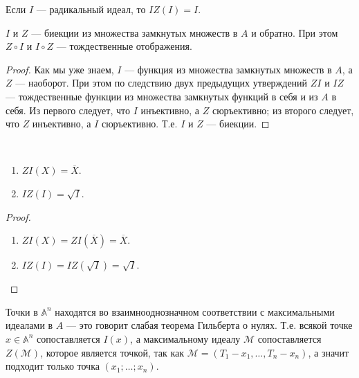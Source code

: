 \documentclass[12pt,a4paper]{article}
\renewcommand{\AA}{\ensuremath{\mathbb{A}}\xspace}
\begin{document}
    \begin{theorem}
        Если $I$ --- радикальный идеал, то $IZ(I) = I$.
    \end{theorem}

    \begin{corollary}
        $I$ и $Z$ --- биекции из множества замкнутых множеств в $A$ и обратно. При этом $Z \circ I$ и $I \circ Z$ --- тождественные отображения.
    \end{corollary}

    \begin{proof}
        Как мы уже знаем, $I$ --- функция из множества замкнутых множеств в $A$, а $Z$ --- наоборот. При этом по следствию двух предыдущих утверждений $ZI$ и $IZ$ --- тождественные функции из множества замкнутых функций в себя и из $A$ в себя. Из первого следует, что $I$ инъективно, а $Z$ сюръективно; из второго следует, что $Z$ инъективно, а $I$ сюръективно. Т.е. $I$ и $Z$ --- биекции.
    \end{proof}

    \begin{corollary}\ 
        \begin{enumerate}
            \item $ZI(X) = \overline{X}$.
            \item $IZ(I) = \sqrt{I}$.
        \end{enumerate}
    \end{corollary}

    \begin{proof}
        \begin{enumerate}
            \item $ZI(X) = ZI(\overline{X}) = \overline{X}$.
            \item $IZ(I) = IZ(\sqrt{I}) = \sqrt{I}$.
        \end{enumerate}
    \end{proof}

    \begin{remark}
        Точки в $\AA^n$ находятся во взаимнооднозначном соответствии с максимальными идеалами в $A$ --- это говорит слабая теорема Гильберта о нулях. Т.е. всякой точке $x \in \AA^n$ сопоставляется $I(x)$, а максимальному идеалу $\mathcal{M}$ сопоставляется $Z(\mathcal{M})$, которое является точкой, так как $\mathcal{M} = (T_1 - x_1, \dots, T_n - x_n)$, а значит подходит только точка $(x_1; \dots; x_n)$.
    \end{remark}
\end{document}
